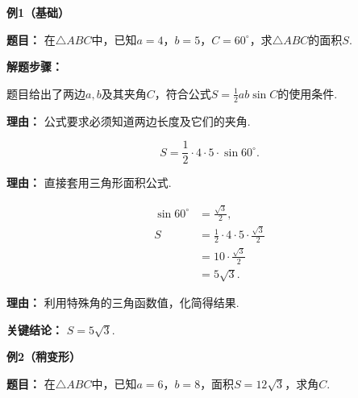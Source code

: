 \begin{examplebox}
	\textbf{\textcolor{CExample}{例1（基础）}}

	\textbf{\textcolor{CExample}{题目：}}
	在$\triangle ABC$中，已知$a=4$，$b=5$，$C=60^\circ$，求$\triangle ABC$的面积$S$.

	\textbf{\textcolor{CExample}{解题步骤：}}
	\begin{description}[style=nextline, leftmargin=2.8em, labelsep=0.5em, itemsep=0.45em]
		\item[\textbf{第一步（确认条件）：}] 题目给出了两边$a,b$及其夹角$C$，符合公式$S=\frac12ab\sin C$的使用条件.
			\par\textbf{理由：} 公式要求必须知道两边长度及它们的夹角.
		\item[\textbf{第二步（代入公式）：}]
			\[
				S = \frac12 \cdot 4 \cdot 5 \cdot \sin 60^\circ.
			\]
			\par\textbf{理由：} 直接套用三角形面积公式.
		\item[\textbf{第三步（计算数值）：}]
			\[
				\begin{aligned}
					\sin 60^\circ &= \frac{\sqrt{3}}{2},\\
					S &= \frac12 \cdot 4 \cdot 5 \cdot \frac{\sqrt{3}}{2} \\
					&= 10 \cdot \frac{\sqrt{3}}{2} \\
					&= 5\sqrt{3}.
			\end{aligned}
			\]
			\par\textbf{理由：} 利用特殊角的三角函数值，化简得结果.
	\end{description}
	\textbf{\textcolor{CExample}{关键结论：}}
	$\displaystyle S = 5\sqrt{3}$.

	\medskip
	\textbf{\textcolor{CExample}{例2（稍变形）}}

	\textbf{\textcolor{CExample}{题目：}}
	在$\triangle ABC$中，已知$a=6$，$b=8$，面积$S=12\sqrt{3}$，求角$C$.


\end{examplebox}
